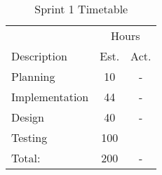 \begin{table}[ht] \small \center
\caption{Sprint 1 Timetable}
\begin{tabularx}{\textwidth}{X c c}
	\toprule
	 & \multicolumn{2}{c}{Hours} \\
	\cmidrule(r){2-3}
	 Description & Est. & Act. \\
	\midrule
	Planning & 10 & -\\
	\addlinespace
	Implementation & 44 & -\\
	\addlinespace
	Design & 40 & -\\
	\addlinespace
	Testing & 100 & \\
	\midrule
	Total: & 200 & - \\
\end{tabularx}
\end{table} 

